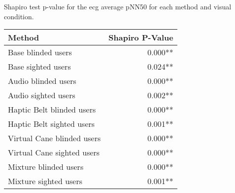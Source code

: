 
\centering
\caption{Shapiro test p-value for the ecg average pNN50 for each method and visual condition.}
\label{tab:shapiro_ecg_pnn50}
\begin{tabular}{lr}
\toprule
                    Method & Shapiro P-Value \\
\midrule
        Base blinded users &         0.000** \\
        Base sighted users &         0.024** \\
       Audio blinded users &         0.000** \\
       Audio sighted users &         0.002** \\
 Haptic Belt blinded users &         0.000** \\
 Haptic Belt sighted users &         0.001** \\
Virtual Cane blinded users &         0.000** \\
Virtual Cane sighted users &         0.000** \\
     Mixture blinded users &         0.000** \\
     Mixture sighted users &         0.001** \\
\bottomrule
\end{tabular}
